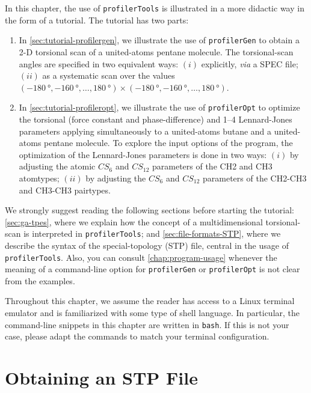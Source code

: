 \documentclass[10pt,a4paper,openany]{memoir}
\numberwithin{equation}{section}
\newcommand{\profileropt}[0]{\texttt{profilerOpt}}
\newcommand{\profilergen}[0]{\texttt{profilerGen}}
\newcommand{\profilertools}[0]{\texttt{profilerTools}}
\begin{document}
In this chapter, the use of \profilertools{} is illustrated in a more
didactic way in the form of a tutorial.
%
The tutorial has two parts:
\begin{enumerate}
\item In \autoref{sec:tutorial-profilergen}, we illustrate the use of
  \profilergen{} to obtain a 2-D torsional scan of a united-atoms
  pentane molecule. The torsional-scan angles are specified in two
  equivalent ways: $(i)$ explicitly, \textit{via} a SPEC file; $(ii)$
  as a systematic scan over the values
  $(\SI{-180}{\degree},\SI{-160}{\degree},\ldots,\SI{180}{\degree}) \times (\SI{-180}{\degree},\SI{-160}{\degree},\ldots,\SI{180}{\degree})$.
\item In \autoref{sec:tutorial-profileropt}, we illustrate the use of
  \profileropt{} to optimize the torsional (force constant and
  phase-difference) and 1--4 Lennard-Jones parameters applying
  simultaneously to a united-atoms butane and a united-atoms pentane
  molecule. To explore the input options of the program, the
  optimization of the Lennard-Jones parameters is done in two ways:
  $(i)$ by adjusting the atomic $CS_6$ and $CS_{12}$ parameters of the
  CH2 and CH3 atomtypes; $(ii)$ by adjusting the $CS_6$ and $CS_{12}$
  parameters of the CH2-CH3 and CH3-CH3 pairtypes.
\end{enumerate}

We strongly suggest reading the following sections before starting the
tutorial: \autoref{sec:ga-tpes}, where we explain how the concept of a
multidimensional torsional-scan is interpreted in \profilertools{};
and \autoref{sec:file-formats-STP}, where we describe the syntax of
the special-topology (STP) file, central in the usage of
\profilertools{}.  Also, you can consult \autoref{chap:program-usage}
whenever the meaning of a command-line option for \profilergen{} or
\profileropt{} is not clear from the examples.

Throughout this chapter, we assume the reader has access to a Linux
terminal emulator and is familiarized with some type of shell
language.
%
In particular, the command-line snippets in this chapter are written
in \texttt{bash}.
%
If this is not your case, please adapt the commands to match your
terminal configuration.

\section{Obtaining an STP File}
\label{sec:tutorial-utils}
\end{document}
